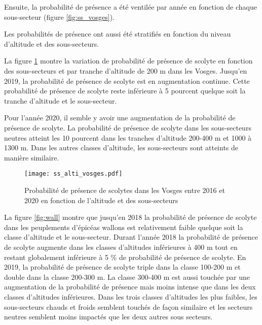 Ensuite, la probabilité de présence a été ventilée par année en fonction de chaque sous-secteur (figure \ref{fig:ss_vosges}). 


Les probabilités de présence ont aussi été stratifiés en fonction du niveau d'altitude et des sous-secteurs.

La figure \ref{fig:vosge} montre la variation de probabilité de présence de scolyte en fonction des sous-secteurs et par tranche d'altitude de 200 m dans les Vosges. Jusqu'en 2019, la probabilité de présence de scolyte est en augmentation continue.
Cette probabilité de présence de scolyte reste inférieure à 5 pourcent quelque soit la tranche d'altitude et le sous-secteur.

Pour l'année 2020, il semble y avoir une augmentation de la probabilité de présence de scolyte. La probabilité de présence de scolyte dans les sous-secteurs neutres atteint les 10 pourcent dans les tranches d'altitude 200-400 m et 1000 à 1300 m. Dans les autres classes d'altitude, les sous-secteurs sont atteints de manière similaire.









\begin{figure} [htbp] 
	\centering
	\texttt{[image: ss\_alti\_vosges.pdf]}
	\caption{Probabilité de présence de scolytes dans les Vosges entre 2016 et 2020 en fonction de l'altitude et des sous-secteurs}
	\label{fig:vosge}
\end{figure}

La figure \ref{fig:wall} montre que jusqu'en 2018 la probabilité de présence de scolyte dans les peuplements d'épicéas wallons est relativement faible quelque soit la classe d'altitude et le sous-secteur. Durant l'année 2018 la probabilité de présence de scolyte augmente dans les classes d'altitudes inférieures à 400 m tout en restant globalement inférieure à 5 \% de probabilité de présence de scolyte.
En 2019, la probabilité de présence de scolyte triple  dans la classe 100-200 m et double dans la classe 200-300 m. La classe 300-400 m est aussi touchée par une augmentation de la probabilité de présence mais moins intense que dans les deux classes d'altitudes inférieures. Dans les trois classes d'altitudes les plus faibles, les sous-secteurs chauds et froids semblent touchés de façon similaire et les secteurs neutres semblent moins impactés que les deux autres sous secteurs. \\

